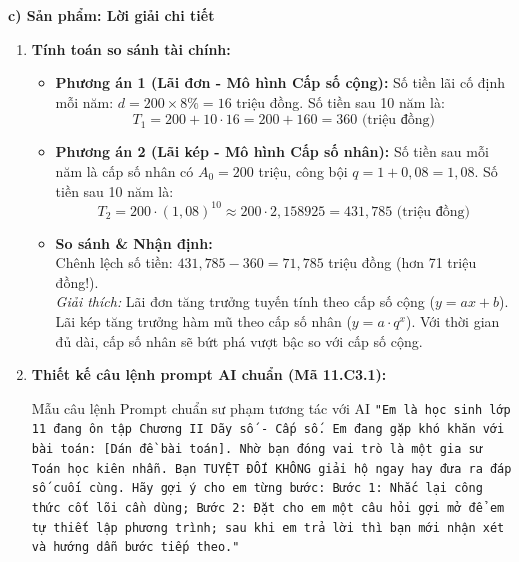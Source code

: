 \documentclass[12pt, a4paper]{article}
\begin{document}
\noindent \textbf{c) Sản phẩm: Lời giải chi tiết}
\begin{enumerate}[leftmargin=0.6cm]
    \item \textbf{Tính toán so sánh tài chính:}
    \begin{itemize}
        \item \textbf{Phương án 1 (Lãi đơn - Mô hình Cấp số cộng):}
        Số tiền lãi cố định mỗi năm: $d = 200 \times 8\% = 16$ triệu đồng.
        Số tiền sau 10 năm là:
        $$T_1 = 200 + 10 \cdot 16 = 200 + 160 = 360\text{ (triệu đồng)}$$
        \item \textbf{Phương án 2 (Lãi kép - Mô hình Cấp số nhân):}
        Số tiền sau mỗi năm là cấp số nhân có $A_0 = 200$ triệu, công bội $q = 1 + 0{,}08 = 1{,}08$.
        Số tiền sau 10 năm là:
        $$T_2 = 200 \cdot (1{,}08)^{10} \approx 200 \cdot 2{,}158925 = 431{,}785\text{ (triệu đồng)}$$
        \item \textbf{So sánh \& Nhận định:}\\
        Chênh lệch số tiền: $431{,}785 - 360 = 71{,}785$ triệu đồng (hơn 71 triệu đồng!).\\
        \textit{Giải thích:} Lãi đơn tăng trưởng tuyến tính theo cấp số cộng ($y = ax + b$). Lãi kép tăng trưởng hàm mũ theo cấp số nhân ($y = a \cdot q^x$). Với thời gian đủ dài, cấp số nhân sẽ bứt phá vượt bậc so với cấp số cộng.
    \end{itemize}

    \item \textbf{Thiết kế câu lệnh prompt AI chuẩn (Mã 11.C3.1):}
    \begin{pedabox}{Mẫu câu lệnh Prompt chuẩn sư phạm tương tác với AI}
    \texttt{"Em là học sinh lớp 11 đang ôn tập Chương II Dãy số - Cấp số. Em đang gặp khó khăn với bài toán: [Dán đề bài toán]. Nhờ bạn đóng vai trò là một gia sư Toán học kiên nhẫn. Bạn TUYỆT ĐỐI KHÔNG giải hộ ngay hay đưa ra đáp số cuối cùng. Hãy gợi ý cho em từng bước: Bước 1: Nhắc lại công thức cốt lõi cần dùng; Bước 2: Đặt cho em một câu hỏi gợi mở để em tự thiết lập phương trình; sau khi em trả lời thì bạn mới nhận xét và hướng dẫn bước tiếp theo."}
    \end{pedabox}
\end{enumerate}
\end{document}
